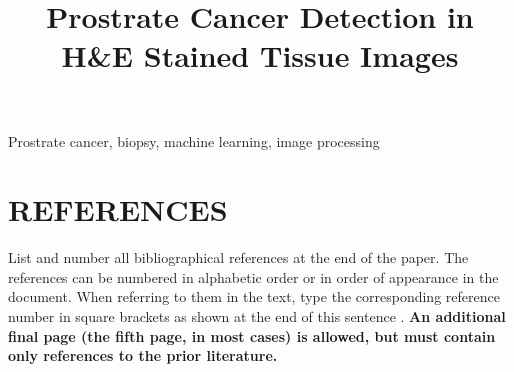 \documentclass{article}
\title{Prostrate Cancer Detection in H\&E Stained Tissue Images}
\begin{document}
%
\maketitle
%
\begin{abstract}

\end{abstract}
%
\begin{keywords}
Prostrate cancer, biopsy, machine learning, image processing
\end{keywords}
%









\section{REFERENCES}
\label{sec:refs}

List and number all bibliographical references at the end of the
paper. The references can be numbered in alphabetic order or in
order of appearance in the document. When referring to them in the
text, type the corresponding reference number in square brackets
as shown at the end of this sentence \cite{C2}. \textbf{An
additional final page (the fifth page, in most cases) is allowed,
but must contain only references to the prior literature.}


\nocite{*}


\end{document}

